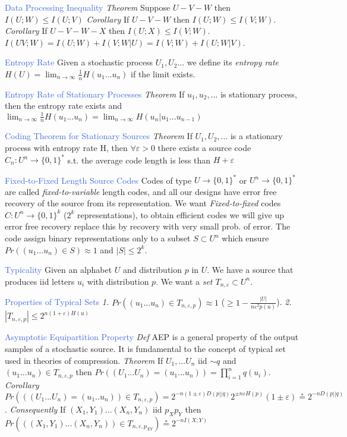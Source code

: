 \documentclass[10pt,a4paper,landscape]{article}
\newcommand{\concept}[1]{\textcolor{RoyalBlue}{#1}}
\newcommand{\subconcept}[1]{\textcolor{PineGreen}{\textit{#1}}}
\renewcommand{\section}[1]{
    \vspace{-0.3cm}
    \begin{center}
      \color{Bittersweet}
      \hrulefill{\small~~#1~~}\hrulefill
    \end{center}
    \vspace{-0.3cm}
  }
\begin{document}
\begin{multicols*}{4}
\concept{Data Processing Inequality} 
\subconcept{Theorem} Suppose $U-V-W$ then $I(U;W) \le I(U;V)$
\subconcept{Corollary} If $U-V-W$ then $I(U;W) \le I(V;W)$.
\subconcept{Corollary} If $U-V-W-X$ then $I(U;X) \le I(V;W)$.
$I(UV;W)=I(U;W)+I(V;W|U)=I(V;W)+I(U;W|V)$.

\concept{Entropy Rate}
Given a stochastic process $U_1,U_2...$ we define its \subconcept{entropy rate}
$H(U)=\lim_{n \to \infty} \frac{1}{n}H(u_1...u_n)$ if the limit exists.

\concept{Entropy Rate of Stationary Processes} 
\subconcept{Theorem} If $u_1,u_2,...$ is stationary process, then the entropy rate exists and $\lim_{n \to \infty} \frac{1}{n}H(u_1...u_n) = \lim_{n \to \infty}H(u_n|u_1...u_{n-1})$

\concept{Coding Theorem for Stationary Sources} 
\subconcept{Theorem} If $U_1,U_2,...$ is a stationary process with entropy rate H, then $\forall \varepsilon > 0$ there exists a source code $C_n:U^n \to \{0,1\}^*$ s.t. the average code length is less than $H+\varepsilon$ 

\concept{Fixed-to-Fixed Length Source Codes} 
Codes of type $U\to \{0,1\}^*$ or $U^n \to \{0,1\}^*$ are called \subconcept{fixed-to-variable} length codes, and all our designs have error free recovery of the source from its representation.
We want \subconcept{Fixed-to-fixed} codes $C:U^n \to \{0,1\}^k$ ($2^k$ representations), to obtain efficient codes we will give up error free recovery replace this by recovery with very small prob. of error.
The code assign binary representations only to a subset $S \subset U^n$ which ensure $Pr((u_1...u_n)\in S) \approx 1$ and $|S|\le 2^k$.

\section{Typicality}

\concept{Typicality}
Given an alphabet $U$ and distribution $p$ in $U$.
We have a source that produces iid letters $u_i$ with distribution $p$.
We want a \subconcept{set $T_{n,\varepsilon} \subset U^n$}.

\concept{Properties of Typical Sets} 
\subconcept{1.} $Pr((u_1...u_n)\in T_{n,\varepsilon,p})\approx1$
($\ge 1 - \frac{|U|}{n\varepsilon^2 p(u)}$).
\subconcept{2.} $|T_{n,\varepsilon,p}| \le 2^{n(1+\varepsilon)H(u)}$

\concept{Asymptotic Equipartition Property}
\subconcept{Def} AEP is a general property of the output samples of a stochastic source. It is fundamental to the concept of typical set used in theories of compression.
\subconcept{Theorem} If $U_1,...U_n$ iid $\sim q$ and $(u_1...u_n) \in T_{n,\varepsilon,p}$ then $Pr((U_1...U_n)=(u_1...u_n))=\prod_{i=1}^n q(u_i)$.
\subconcept{Corollary} $Pr(((U_1...U_n)=(u_1..u_n))\in T_{n,\varepsilon,p})=2^{-n(1\pm \varepsilon)D(p||q)}2^{\pm n\varepsilon H(p)}(1 \pm \varepsilon) \circeq 2^{-nD(p||q)}$.
\subconcept{Consequently} If $(X_1,Y_1)...(X_n,Y_n)$ iid $p_X p_Y$ then $Pr(((X_1,Y_1)...(X_n,Y_n))\in T_{n,\varepsilon,p_{XY}}) \circeq 2^{-nI(X;Y)}$


\end{multicols*}
\end{document}
